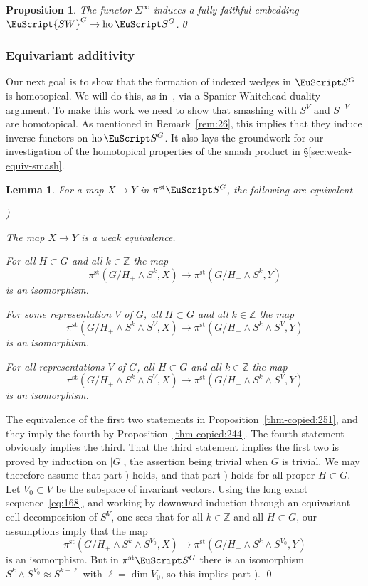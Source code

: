 \documentclass{amsart}
\newtheorem{lem}[equation]{Lemma}
\newtheorem{prop}[equation]{Proposition}
\theoremstyle{definition}
\theoremstyle{remark}
\newenvironment{pf}{\bigskip{\em Proof:\/}}{\qed\medskip}
\newcommand{\Z}{{\mathbb Z}}
\newcounter{thmItem}
\newcommand{\thmListItem}[1]{\rm \romannumeral#1)}
\newenvironment{thmList}{\begin{list}%
{\rm \roman{thmItem})}{\usecounter{thmItem}
\setlength{\labelwidth}{2em}
\setlength{\itemindent}{2em}
\setlength{\leftmargin}{0pt}
\setlength{\listparindent}{0pt}
\setlength{\parsep}{0pt}
\setlength{\partopsep}{0pt}
\setlength{\itemsep}{\medskipamount}
\setlength{\topsep}{\medskipamount}
}}{\end{list}}
\newcommand{\spectra}{\EuScript S}
\newcommand{\swg}[1]{\EuScript {SW}^{#1}}
\DeclareMathOperator{\ho}{ho}
\newcommand{\ugspectra}[1]{\spectra^{#1}}
\newcommand{\pist}{\pi^{\text{st}}}
\begin{document}
\begin{prop}
\label{thm:243}
The functor $\Sigma^{\infty}$ induces a fully faithful embedding
$\swg{G}\to \ho\ugspectra{G}$.\qed
\end{prop}


\subsubsection{Equivariant additivity}
\label{sec:equiv-addit}

Our next goal is to show that the formation of indexed wedges in
$\ugspectra{G}$ is homotopical.  We will do this, as
in~\cite{MR764596}, via a Spanier-Whitehead duality argument.  To make
this work we need to show that smashing with $S^{V}$ and $S^{-V}$ are
homotopical.  As mentioned in Remark~\ref{rem:26}, this implies that
they induce inverse functors on $\ho\ugspectra{G}$.  It also lays
the groundwork for our investigation of the homotopical properties of
the smash product in \S\ref{sec:weak-equiv-smash}.

\begin{lem}
\label{thm:136}
For a map $X\to Y$ in $\pist\ugspectra{G}$, the following are
equivalent
\begin{thmList}
\item The map $X\to Y$ is a weak equivalence.
\item For all $H\subset G$ and all $k\in\Z$ the map 
\[
\pist(G/H_{+}\wedge S^{k},X)\to 
\pist(G/H_{+}\wedge S^{k},Y)
\]
is an isomorphism.
\item For {\em some} representation $V$ of $G$, all $H\subset G$ and all $k\in\Z$ the map 
\[
\pist(G/H_{+}\wedge S^{k}\wedge S^{V},X)\to 
\pist(G/H_{+}\wedge S^{k}\wedge S^{V},Y)
\]
is an isomorphism.
\item For {\em all} representations $V$ of $G$, all $H\subset G$ and all $k\in\Z$ the map 
\[
\pist(G/H_{+}\wedge S^{k}\wedge S^{V},X)\to 
\pist(G/H_{+}\wedge S^{k}\wedge S^{V},Y)
\]
is an isomorphism.
\end{thmList}
\end{lem}

\begin{pf}
The equivalence of the first two statements in
Proposition~\ref{thm-copied:251}, and they imply the fourth by
Proposition~\ref{thm-copied:244}.  The fourth statement obviously
implies the third.  That the third statement implies the first two
is proved by induction on $|G|$, the assertion being trivial when $G$
is trivial.  We may therefore assume that part \thmListItem{3} holds,
and that part \thmListItem{2} holds for all proper $H\subset G$.  Let
$V_{0}\subset V$ be the subspace of invariant vectors.  Using the long
exact sequence~\eqref{eq:168}, and working by downward induction
through an equivariant cell decomposition of $S^{V}$, one sees that
for all $k\in\Z$ and all $H\subset G$, our assumptions imply that the
map
\[
\pist(G/H_{+}\wedge S^{k}\wedge S^{V_{0}},X)\to 
\pist(G/H_{+}\wedge S^{k}\wedge S^{V_{0}},Y)
\]
is an isomorphism.   But in $\pist\ugspectra{G}$ there is an
isomorphism  $S^{k}\wedge S^{V_{0}}\approx S^{k+\ell}$ with $\ell=\dim
V_{0}$, so this implies part \thmListItem{2}.
\end{pf}
\end{document}
